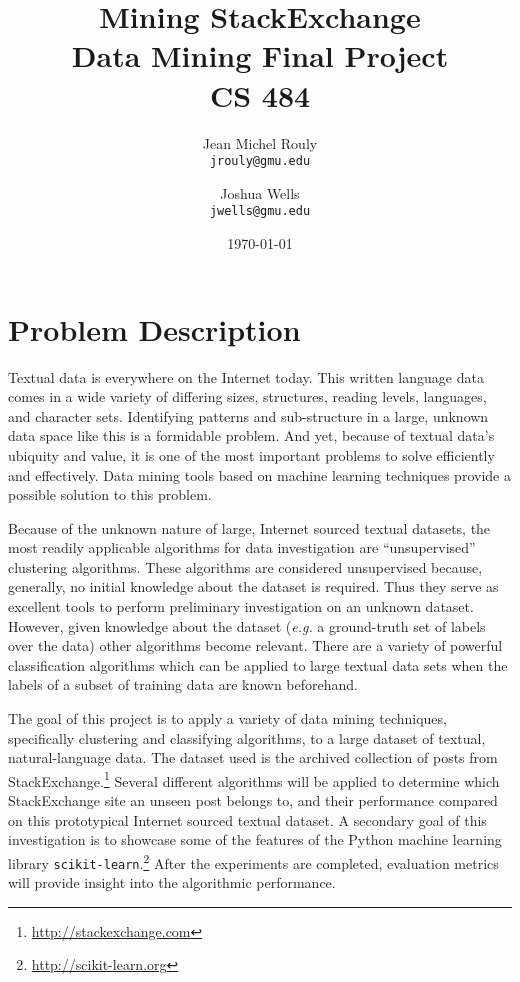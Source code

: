 \documentclass[letterpaper,10pt]{article}
\title{
  \Huge\textbf{Mining StackExchange} \\
  \LARGE Data Mining Final Project \\
  CS 484 \\
}
\author{
  Jean Michel Rouly\\
  \texttt{jrouly@gmu.edu}
  \and
  Joshua Wells\\
  \texttt{jwells@gmu.edu}
}
\date{\today}
\begin{document}
\maketitle


\section{Problem Description}

Textual data is everywhere on the Internet today. This written language
data comes in a wide variety of differing sizes, structures, reading
levels, languages, and character sets. Identifying patterns and
sub-structure in a large, unknown data space like this is a formidable
problem. And yet, because of textual data's ubiquity and value, it is one
of the most important problems to solve efficiently and effectively. Data
mining tools based on machine learning techniques provide a possible
solution to this problem.

Because of the unknown nature of large, Internet sourced textual datasets,
the most readily applicable algorithms for data investigation are
``unsupervised'' clustering algorithms. These algorithms are considered
unsupervised because, generally, no initial knowledge about the dataset is
required. Thus they serve as excellent tools to perform preliminary
investigation on an unknown dataset. However, given knowledge about the
dataset (\textit{e.g.} a ground-truth set of labels over the data) other
algorithms become relevant. There are a variety of powerful classification
algorithms which can be applied to large textual data sets when the labels
of a subset of training data are known beforehand.

The goal of this project is to apply a variety of data mining techniques,
specifically clustering and classifying algorithms, to a large dataset of
textual, natural-language data. The dataset used is the archived collection
of posts from StackExchange.\footnote{\url{http://stackexchange.com}}
Several different algorithms will be applied to determine which
StackExchange site an unseen post belongs to, and their performance
compared on this prototypical Internet sourced textual dataset. A secondary
goal of this investigation is to showcase some of the features of the
Python machine learning library
\texttt{scikit-learn}.\footnote{\url{http://scikit-learn.org}} After the
experiments are completed, evaluation metrics will provide insight into the
algorithmic performance.
\end{document}
